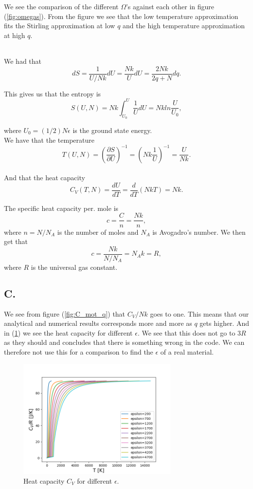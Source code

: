 \documentclass[reprint,english,notitlepage]{revtex4-1}  %
\begin{document}
We see the comparison of the different $\Omega$'s against each other in figure (\ref{fig:omegas}). From the figure we see that the low temperature approximation fits the Stirling approximation at low $q$ and the high temperature approximation at high $q$.

~\\
We had that $$dS=\frac{1}{U/Nk}dU=\frac{Nk}{U}dU=\frac{2Nk}{2q+N}dq.$$

This gives us that the entropy is $$S(U,N)=Nk\int_{U_0}^U \frac{1}{U}dU=Nk ln\frac{U}{U_0},$$

where $U_0=(1/2)N\epsilon$ is the ground state energy.
~\\

 We have that the temperature $$T(U,N)=(\frac{\partial S}{\partial U})^{-1}=(Nk\frac{1}{U})^{-1}=\frac{U}{Nk}.$$
 ~\\
 And that the heat capacity $$C_V(T,N)=\frac{dU}{dT}=\frac{d}{dT}(NkT)=Nk.$$

The specific heat capacity per. mole is $$ c=\frac{C}{n}=\frac{Nk}{n},$$
where $n=N/N_A$ is the number of moles and $N_A$ is Avogadro's number. We then get that 
$$ c=\frac{Nk}{N/N_A}=N_Ak=R,$$
where $R$ is the universal gas constant.

\subsection*{C.}
We see from figure (\ref{fig:C_mot_q}) that $C_V/Nk$ goes to one. This means that our analytical and numerical results corresponds more and more as $q$ gets higher. And in (\ref{fig:comparrison}) we see the heat capacity for different $\epsilon$. We see that this does not go to $3R$ as they should and concludes that there is something wrong in the code. We can therefore not use this for a comparison to find the $\epsilon$ of a real material.

\begin{figure}
\centering
\includegraphics[width=8cm]{../figures/C_comparrison.png}
\caption{Heat capacity $C_V$ for different $\epsilon$.}
\label{fig:comparrison}
\end{figure}
\end{document}
